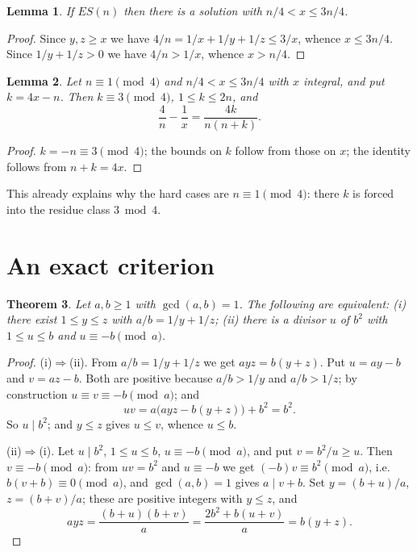 \documentclass[11pt,a4paper]{article}
\newtheorem{theorem}{Theorem}
\newtheorem{lemma}[theorem]{Lemma}
\theoremstyle{definition}
\begin{document}
\begin{lemma}\label{lem:window}
If $ES(n)$ then there is a solution with $n/4<x\le 3n/4$.
\end{lemma}
\begin{proof}
Since $y,z\ge x$ we have $4/n=1/x+1/y+1/z\le 3/x$, whence $x\le 3n/4$. Since
$1/y+1/z>0$ we have $4/n>1/x$, whence $x>n/4$.
\end{proof}

\begin{lemma}
Let $n\equiv 1\pmod 4$ and $n/4<x\le 3n/4$ with $x$ integral, and put
$k=4x-n$. Then $k\equiv 3\pmod 4$, $1\le k\le 2n$, and
\[
  \frac4n-\frac1x=\frac{4k}{n(n+k)}.
\]
\end{lemma}
\begin{proof}
$k=-n\equiv 3\pmod 4$; the bounds on $k$ follow from those on $x$; the identity
follows from $n+k=4x$.
\end{proof}

This already explains why the hard cases are $n\equiv 1\pmod 4$: there $k$ is
forced into the residue class $3\bmod 4$.

\section{An exact criterion}\label{sec:criterion}

\begin{theorem}\label{thm:criterion}
Let $a,b\ge 1$ with $\gcd(a,b)=1$. The following are equivalent: (i) there exist
$1\le y\le z$ with $a/b=1/y+1/z$; (ii) there is a divisor $u$ of $b^2$ with
$1\le u\le b$ and $u\equiv -b\pmod a$.
\end{theorem}
\begin{proof}
(i)$\Rightarrow$(ii). From $a/b=1/y+1/z$ we get $ayz=b(y+z)$. Put $u=ay-b$ and
$v=az-b$. Both are positive because $a/b>1/y$ and $a/b>1/z$; by construction
$u\equiv v\equiv -b\pmod a$; and
\[
  uv=a\bigl(ayz-b(y+z)\bigr)+b^{2}=b^{2}.
\]
So $u\mid b^{2}$; and $y\le z$ gives $u\le v$, whence $u\le b$.

(ii)$\Rightarrow$(i). Let $u\mid b^{2}$, $1\le u\le b$, $u\equiv -b\pmod a$,
and put $v=b^{2}/u\ge u$. Then $v\equiv -b\pmod a$: from $uv=b^{2}$ and
$u\equiv -b$ we get $(-b)v\equiv b^{2}\pmod a$, i.e. $b(v+b)\equiv 0\pmod a$,
and $\gcd(a,b)=1$ gives $a\mid v+b$. Set $y=(b+u)/a$, $z=(b+v)/a$; these are
positive integers with $y\le z$, and
\[
  ayz=\frac{(b+u)(b+v)}{a}=\frac{2b^{2}+b(u+v)}{a}=b(y+z).
\]
\end{proof}
\end{document}
